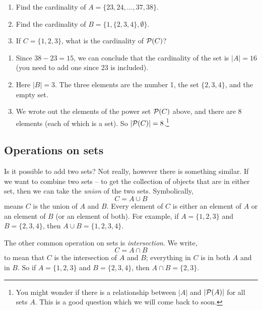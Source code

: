 \documentclass[12pt]{article}
\begin{document}
\begin{example}
\begin{enumerate}
\item Find the cardinality of $A = \{23, 24, \ldots, 37, 38\}$.
\item Find the cardinality of $B = \{1, \{2, 3, 4\}, \emptyset\}$.
\item If $C = \{1,2,3\}$, what is the cardinality of $\mathcal P(C)$?
\end{enumerate}
  
\begin{solution}
\begin{enumerate}
\item Since $38 - 23 = 15$, we can conclude that the cardinality of the set is $|A| = 16$ (you need to add one since 23 is included).
\item Here $|B| = 3$.  The three elements are the number 1, the set $\{2,3,4\}$, and the empty set.  
\item We wrote out the elements of the power set $\mathcal P(C)$ above, and there are 8 elements (each of which is a set).  So $|\mathcal P(C)| = 8$.\footnote{You might wonder if there is a relationship between $|A|$ and $|\mathcal P(A)|$ for all sets $A$.  This is a good question which we will come back to soon.}
\end{enumerate}
 
\end{solution}
\end{example}

\subsection{Operations on sets}

Is it possible to add two sets?  Not really, however there is something similar.  If we want to combine two sets -- to get the collection of objects that are in either set, then we can take the \emph{union} of the two sets.  Symbolically,
\[ C = A \cup B\]
means $C$ is the union of $A$ and $B$.  Every element of $C$ is either an element of $A$ or an element of $B$ (or an element of both).  For example, if $A = \{1, 2, 3\}$ and $B = \{2, 3, 4\}$, then $A \cup B = \{1, 2, 3, 4\}$.

The other common operation on sets is \emph{intersection}.  We write,
\[ C = A \cap B\]
to mean that $C$ is the intersection of $A$ and $B$; everything in $C$ is in both $A$ and in $B$.  So if $A = \{1, 2, 3\}$ and $B = \{2, 3, 4\}$, then $A \cap B = \{2, 3\}$.  
\end{document}
